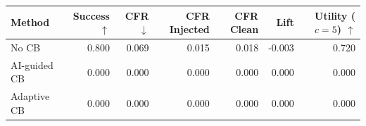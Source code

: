 \begin{tabular}{lrrrrrr}
\toprule
Method & Success $\uparrow$ & CFR $\downarrow$ & CFR Injected & CFR Clean & Lift & Utility ($c=5$) $\uparrow$ \\
\midrule
No CB & 0.800 & 0.069 & 0.015 & 0.018 & -0.003 & 0.720 \\
AI-guided CB & 0.000 & 0.000 & 0.000 & 0.000 & 0.000 & 0.000 \\
Adaptive CB & 0.000 & 0.000 & 0.000 & 0.000 & 0.000 & 0.000 \\
\bottomrule
\end{tabular}
